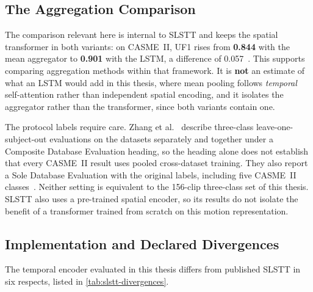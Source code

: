 \subsection{The Aggregation Comparison}
\label{sec:slstt-results}

The comparison relevant here is internal to SLSTT and keeps the spatial transformer in both variants: on CASME~II, UF1 rises from \textbf{0.844} with the mean aggregator to \textbf{0.901} with the LSTM, a difference of 0.057~\cite{zhang2022}. This supports comparing aggregation methods within that framework. It is \textbf{not} an estimate of what an LSTM would add in this thesis, where mean pooling follows \emph{temporal} self-attention rather than independent spatial encoding, and it isolates the aggregator rather than the transformer, since both variants contain one.

The protocol labels require care. Zhang et al.~\cite{zhang2022} describe three-class leave-one-subject-out evaluations on the datasets separately and together under a Composite Database Evaluation heading, so the heading alone does not establish that every CASME~II result uses pooled cross-dataset training. They also report a Sole Database Evaluation with the original labels, including five CASME~II classes~\cite{zhang2022}. Neither setting is equivalent to the 156-clip three-class set of this thesis. SLSTT also uses a pre-trained spatial encoder, so its results do not isolate the benefit of a transformer trained from scratch on this motion representation.

\subsection{Implementation and Declared Divergences}
\label{sec:transformer-implications}

The temporal encoder evaluated in this thesis differs from published SLSTT in six respects, listed in \autoref{tab:slstt-divergences}.

